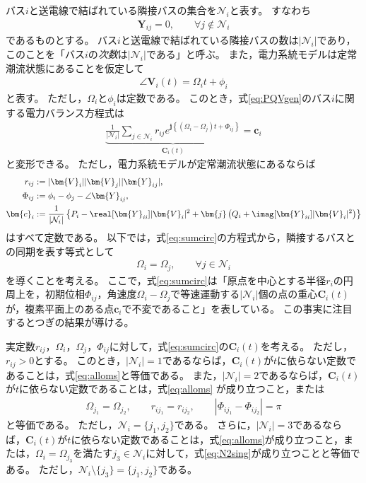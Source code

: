 \documentclass[tombow,dvipdfmx]{corona-a5}
\begin{document}
バス$i$と送電線で結ばれている隣接バスの集合を$\mathcal{N}_i$と表す。
すなわち
\begin{align*}
\bm{Y}_{ij} = 0,\qquad \forall j \notin \mathcal{N}_i
\end{align*}
であるものとする。
バス$i$と送電線で結ばれている隣接バスの数は$|\mathcal{N}_i|$であり，このことを「バス$i$の\emph{次数}は$|\mathcal{N}_i|$である」と呼ぶ。
また，電力系統モデルは定常潮流状態にあることを仮定して
\begin{align*}
\angle \bm{V}_i (t) = \Omega_i t +\phi_i
\end{align*}
と表す。
ただし，$\Omega_i$と$\phi_i$は定数である。
このとき，式\ref{eq:PQVgen}のバス$i$に関する電力バランス方程式は
\begin{align}\label{eq:sumcirc}
\underbrace{
\frac{1}{|\mathcal{N}_i|}\sum_{j \in \mathcal{N}_i } 
r_{ij}
e^{\bm{j} 
\left\{
(\Omega_i - \Omega_j)t + 
\Phi_{ij}
\right\} }
}_{\bm{C}_i (t)}
= \bm{c}_i
\end{align}
と変形できる。
ただし，電力系統モデルが定常潮流状態にあるならば
\begin{align*}
r_{ij} &:=|\bm{V}_i| |\bm{V}_j| |\bm{Y}_{ij}|, 
\\
\Phi_{ij} &:= \phi_i - \phi_j - \angle \bm{Y}_{ij},
\\
\bm{c}_i &:=  \frac{1}{|\mathcal{N}_i|}
\left\{
P_i - \real[\bm{Y}_{ii}] |\bm{V}_i|^2
+ \bm{j}
\left(
Q_i + \imag [\bm{Y}_{ii}] |\bm{V}_i|^2
\right)
\right\}
\end{align*}
はすべて定数である。
以下では，式\ref{eq:sumcirc}の方程式から，隣接するバスとの同期を表す等式として
\begin{align}\label{eq:alloms}
\Omega_i = \Omega_{j} 
,\qquad 
\forall j\in \mathcal{N}_i
\end{align}
を導くことを考える。
ここで，式\ref{eq:sumcirc}は「原点を中心とする半径$r_i$の円周上を，初期位相$\Phi_{ij}$，角速度$\Omega_i-\Omega_j$で等速運動する$|\mathcal{N}_i|$個の点の重心$\bm{C}_i (t)$が，複素平面上のある点$\bm{c}_i$で不変であること」を表している。
この事実に注目するとつぎの結果が導ける。


\begin{補題}[電力バランス方程式から導かれるバスの同期]
\label{lem:sumc2}
実定数$r_{ij}$，$\Omega_i$，$\Omega_j$，$\Phi_{ij}$に対して，式\ref{eq:sumcirc}の$\bm{C}_i (t)$を考える。
ただし，$r_{ij}>0$とする。
このとき，$|\mathcal{N}_i|=1$であるならば，$\bm{C}_i (t)$が$t$に依らない定数であることは，式\ref{eq:alloms}と等価である。
また，$|\mathcal{N}_i|=2$であるならば，$\bm{C}_i (t)$が$t$に依らない定数であることは，式\ref{eq:alloms}
が成り立つこと，または
\begin{align}\label{eq:N2sing}
\Omega_{j_1} = \Omega_{j_2}
,\qquad
r_{i j_1} = r_{i j_2}
,\qquad
|\Phi_{i j_1}-\Phi_{i j_2}| = \pi
\end{align}
と等価である。
ただし，$\mathcal{N}_i = \{j_1,j_2\}$である。
さらに，$|\mathcal{N}_i|=3$であるならば，$\bm{C}_i (t)$が$t$に依らない定数であることは，式\ref{eq:alloms}が成り立つこと，または，$\Omega_{i} = \Omega_{j_3}$を満たす$j_3 \in \mathcal{N}_i$に対して，式\ref{eq:N2sing}が成り立つことと等価である。
ただし，$ \mathcal{N}_i \setminus \{j_3\}=\{j_1,j_2\}$である。
\end{補題}
\end{document}
